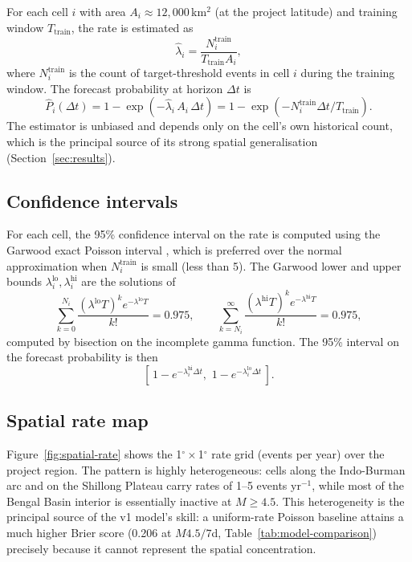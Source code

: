 \documentclass[10pt,a4paper,twocolumn]{article}
\begin{document}
For each cell $i$ with area $A_i\approx 12{,}000$\,km$^2$ (at the project latitude) and training window $T_{\text{train}}$, the rate is estimated as
\[
\hat\lambda_i = \frac{N_i^{\text{train}}}{T_{\text{train}} A_i},
\]
where $N_i^{\text{train}}$ is the count of target-threshold events in cell $i$ during the training window. The forecast probability at horizon $\Delta t$ is
\[
\hat P_i(\Delta t) = 1 - \exp\!\left(-\hat\lambda_i \, A_i \, \Delta t\right) = 1 - \exp\!\left(-N_i^{\text{train}} \Delta t / T_{\text{train}}\right).
\]
The estimator is unbiased and depends only on the cell's own historical count, which is the principal source of its strong spatial generalisation (Section~\ref{sec:results}).

\subsection{Confidence intervals}

For each cell, the 95\% confidence interval on the rate is computed using the Garwood exact Poisson interval \cite{garwood1936}, which is preferred over the normal approximation when $N_i^{\text{train}}$ is small (less than 5). The Garwood lower and upper bounds $\lambda_i^{\text{lo}}, \lambda_i^{\text{hi}}$ are the solutions of
\[
\sum_{k=0}^{N_i} \frac{(\lambda^{\text{lo}} T)^k e^{-\lambda^{\text{lo}} T}}{k!} = 0.975, \qquad \sum_{k=N_i}^{\infty} \frac{(\lambda^{\text{hi}} T)^k e^{-\lambda^{\text{hi}} T}}{k!} = 0.975,
\]
computed by bisection on the incomplete gamma function. The 95\% interval on the forecast probability is then
\[
\left[\,1 - e^{-\lambda_i^{\text{hi}} \Delta t},\,\, 1 - e^{-\lambda_i^{\text{lo}} \Delta t}\,\right].
\]

\subsection{Spatial rate map}

Figure~\ref{fig:spatial-rate} shows the 1$^\circ\times$1$^\circ$ rate grid (events per year) over the project region. The pattern is highly heterogeneous: cells along the Indo-Burman arc and on the Shillong Plateau carry rates of 1--5 events yr$^{-1}$, while most of the Bengal Basin interior is essentially inactive at $M\geq4.5$. This heterogeneity is the principal source of the v1 model's skill: a uniform-rate Poisson baseline attains a much higher Brier score (0.206 at $M4.5/7$d, Table~\ref{tab:model-comparison}) precisely because it cannot represent the spatial concentration.
\end{document}

